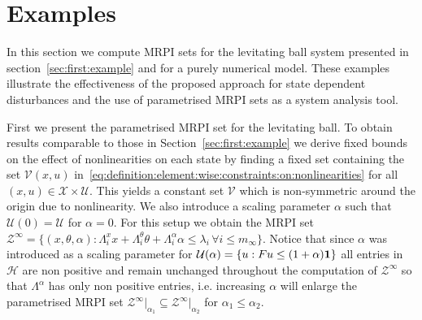 \documentclass[letterpaper, 10pt, conference]{ieeeconf} %
\begin{document}
\section{Examples}\label{sec:second:example}
%
%
In this section we compute MRPI sets for the levitating ball system presented in 
section~\ref{sec:first:example} and for a purely numerical model. These examples illustrate the effectiveness of the proposed approach for state dependent disturbances and the use of parametrised MRPI sets as a system analysis tool. 

First we present the parametrised MRPI
set for the levitating ball. To obtain results comparable to those in Section~\ref{sec:first:example} we derive fixed bounds
on the effect of nonlinearities on each state by finding a fixed set containing the set $\mathcal V(x,u)$ 
in~\eqref{eq:definition:element:wise:constraints:on:nonlinearities} for all $(x,u)\in\mathcal X\times\mathcal U$. 
This yields a constant set $\mathcal V$ which is non-symmetric around the origin due to nonlinearity. We also introduce
a scaling parameter $\alpha$ such that $\mathcal U(0)=\mathcal U$ for $\alpha=0$. For this setup we obtain the MRPI
set $\mathcal Z^\infty=\{(x,\theta,\alpha): \Lambda_i^x x + \Lambda_i^\theta \theta + \Lambda_i^\alpha \alpha\leq
\lambda_i\,\forall i\leq m_\infty\}$. Notice that since $\alpha$ was introduced as a scaling parameter
for $\mathcal U(\alpha)=\{u: Fu\leq (1+\alpha){\bf{1}}\}$ all entries in $\mathcal H$ are non positive and
remain unchanged throughout the computation of $\mathcal Z^\infty$ so that $\Lambda^\alpha$ has only non
positive entries, i.e. increasing $\alpha$ will enlarge the parametrised MRPI set $\mathcal Z^\infty\vert_{\alpha_1}
\subseteq\mathcal Z^\infty\vert_{\alpha_2}$ for $\alpha_1\leq\alpha_2$.
\end{document}
